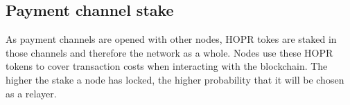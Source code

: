 \subsection{Payment channel stake}

As payment channels are opened with other nodes, HOPR tokes are staked in those channels and therefore the network as a whole. Nodes use these HOPR
tokens to cover transaction costs when interacting with the blockchain. The higher
the stake a node has locked, the higher probability that it will be chosen as a relayer.
